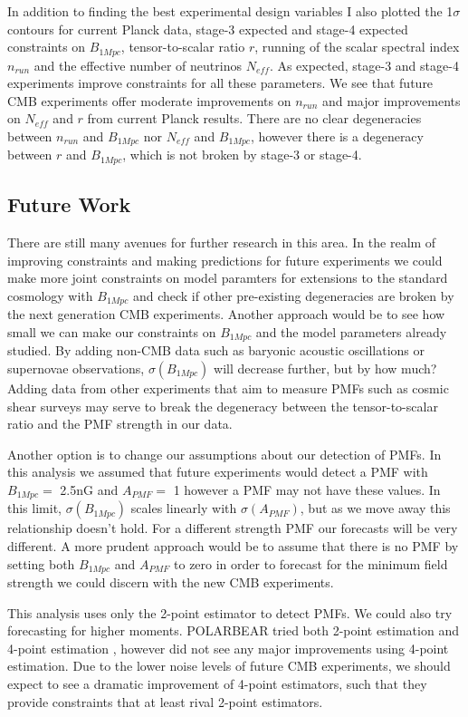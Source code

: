 In addition to finding the best experimental design variables I also plotted the 1$\sigma$ contours for current Planck data, stage-3 expected and stage-4 expected constraints on $B_{1Mpc}$, tensor-to-scalar ratio $r$, running of the scalar spectral index $n_{run}$ and the effective number of neutrinos $N_{eff}$. As expected, stage-3 and stage-4 experiments improve constraints for all these parameters. We see that future CMB experiments offer moderate improvements on $n_{run}$ and major improvements on $N_{eff}$ and $r$ from current Planck results. There are no clear degeneracies between $n_{run}$ and $B_{1Mpc}$ nor $N_{eff}$ and $B_{1Mpc}$, however there is a degeneracy between $r$ and $B_{1Mpc}$, which is not broken by stage-3 or stage-4.

\subsection{Future Work}

There are still many avenues for further research in this area. In the realm of improving constraints and making predictions for future experiments we could make more joint constraints on model paramters for extensions to the standard cosmology with $B_{1Mpc}$ and check if other pre-existing degeneracies are broken by the next generation CMB experiments. Another approach would be to see how small we can make our constraints on $B_{1Mpc}$ and the model parameters already studied. By adding non-CMB data such as baryonic acoustic oscillations or supernovae observations, $\sigma(B_{1Mpc})$ will decrease further, but by how much? Adding data from other experiments that aim to measure PMFs such as cosmic shear surveys \cite{2012JCAP...11..055F} may serve to break the degeneracy between the tensor-to-scalar ratio and the PMF strength in our data.

Another option is to change our assumptions about our detection of PMFs. In this analysis we assumed that future experiments would detect a PMF with $B_{1Mpc} =$ 2.5nG and $A_{PMF} =$ 1 however a PMF may not have these values. In this limit, $\sigma(B_{1Mpc})$ scales linearly with $\sigma(A_{PMF})$, but as we move away this relationship doesn't hold. For a different strength PMF our forecasts will be very different. A more prudent approach would be to assume that there is no PMF by setting both $B_{1Mpc}$ and $A_{PMF}$ to zero in order to forecast for the minimum field strength we could discern with the new CMB experiments.

This analysis uses only the 2-point estimator to detect PMFs. We could also try forecasting for higher moments. POLARBEAR tried both 2-point estimation and 4-point estimation \cite{Ade:2015cao}, however did not see any major improvements using 4-point estimation. Due to the lower noise levels of future CMB experiments, we should expect to see a dramatic improvement of 4-point estimators, such that they provide constraints that at least rival 2-point estimators.

